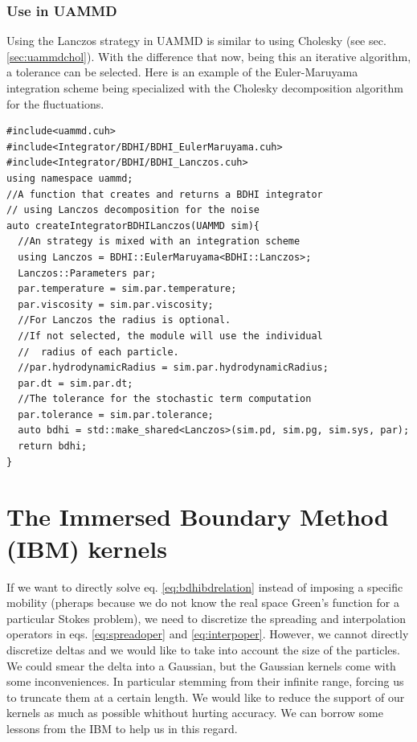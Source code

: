 \documentclass[ twoside,openright,titlepage,numbers=noenddot,%
headinclude,footinclude,cleardoublepage=empty,abstract=on,
BCOR=5mm,paper=a4,fontsize=11pt, dvipsnames
]{scrreprt}
\def\ucpp{uammd_cpp_lexer.py:UAMMDCppLexer -x}
\newcommand{\uammd}{\gls{UAMMD}\xspace}
\begin{document}
\subsubsection*{Use in UAMMD}
Using the Lanczos strategy in \uammd is similar to using Cholesky (see sec. \ref{sec:uammdchol}). With the difference that now, being this an iterative algorithm, a tolerance can be selected.
Here is an example of the Euler-Maruyama integration scheme being specialized with the Cholesky decomposition algorithm for the fluctuations.
\begin{verbatim}
#include<uammd.cuh>
#include<Integrator/BDHI/BDHI_EulerMaruyama.cuh>
#include<Integrator/BDHI/BDHI_Lanczos.cuh>
using namespace uammd;
//A function that creates and returns a BDHI integrator
// using Lanczos decomposition for the noise
auto createIntegratorBDHILanczos(UAMMD sim){   
  //An strategy is mixed with an integration scheme
  using Lanczos = BDHI::EulerMaruyama<BDHI::Lanczos>;
  Lanczos::Parameters par;
  par.temperature = sim.par.temperature;
  par.viscosity = sim.par.viscosity;
  //For Lanczos the radius is optional.
  //If not selected, the module will use the individual 
  //  radius of each particle.
  //par.hydrodynamicRadius = sim.par.hydrodynamicRadius;
  par.dt = sim.par.dt;
  //The tolerance for the stochastic term computation
  par.tolerance = sim.par.tolerance;
  auto bdhi = std::make_shared<Lanczos>(sim.pd, sim.pg, sim.sys, par);
  return bdhi;
}
\end{verbatim}


\section{The Immersed Boundary Method (IBM) kernels}\label{sec:ibm}
If we want to directly solve eq. \eqref{eq:bdhibdrelation} instead of imposing a specific mobility (pheraps because we do not know the real space Green's function for a particular Stokes problem), we need to discretize the spreading and interpolation operators in eqs. \eqref{eq:spreadoper} and \eqref{eq:interpoper}. However, we cannot directly discretize deltas and we would like to take into account the size of the particles. We could smear the delta into a Gaussian, but the Gaussian kernels come with some inconveniences. In particular stemming from their infinite range, forcing us to truncate them at a certain length. We would like to reduce the support of our kernels as much as possible whithout hurting accuracy. We can borrow some lessons from the \gls{IBM} to help us in this regard.
\end{document}
